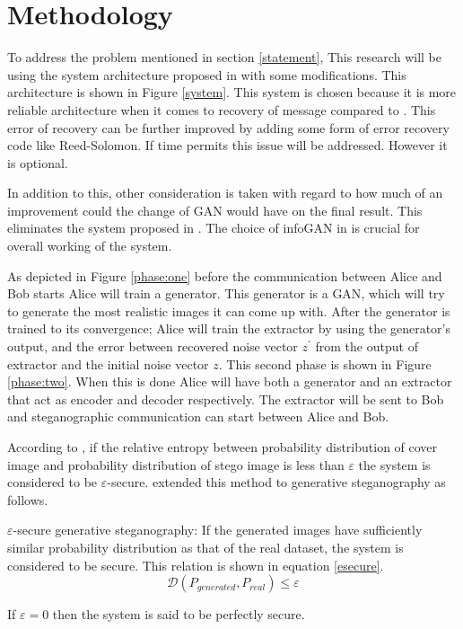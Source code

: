 \documentclass[../main/main.tex]{subfiles}
\begin{document}
	
	\section{ Methodology}
	To address the problem mentioned in section \ref{statement}, This research will be using the system architecture proposed in  with some modifications. This architecture is shown in Figure \ref{system}. This system is chosen because it is more reliable architecture when it comes to recovery of message  compared to . This error of recovery can be further improved by adding some form of error recovery code like Reed-Solomon. If time permits this issue will be addressed. However it is optional. 
	
	In addition to this, other consideration is taken with regard to how much of an improvement could the change of \gls{GAN} would have on the final result. This eliminates the system proposed in . The choice of \gls{infoGAN} in  is crucial for overall working of the system. 
	
	
	
	As depicted in Figure \ref{phase:one} before the communication between Alice and Bob starts Alice will train a generator. This generator is a \gls{GAN}, which will try to generate the most realistic images it can come up with.
	After the generator is trained to its convergence; Alice will train the extractor by using the generator's output, and the error between recovered noise vector $z^\prime$ from the output of extractor and the initial noise vector $z$. This second phase is shown in Figure \ref{phase:two}. When this is done Alice will have both a generator and an extractor that act as  encoder and  decoder respectively. The extractor will be sent to Bob and steganographic communication can start between Alice and Bob.
	
	According to ,  if the relative entropy between  probability distribution of  cover image and probability distribution of stego image is less than $\varepsilon$ the system is considered to be $\varepsilon$-secure.  extended this method to generative steganography as follows. 
		
	\theoremstyle{definition}
	\begin{definition}{$\varepsilon$-secure generative steganography: }
		If the generated images have sufficiently similar probability distribution as that of the real dataset,  the system is considered to be secure. This relation is shown in equation \ref{esecure}.
		\begin{equation} \label{esecure}
		\mathcal{D}(P_{generated},P_{real}) \leq \varepsilon
		\end{equation}
		
		If $\varepsilon=0$ then the system is said to be perfectly secure. 
	\end{definition}
\end{document}
